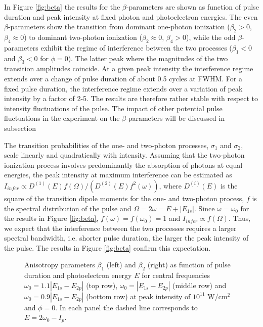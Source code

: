 In Figure \ref{fig:beta} the results for the \textbf{$\beta$}-parameters are shown as function of pulse duration and peak intensity at fixed photon and photoelectron energies. The even $\beta$-parameters show the transition from dominant one-photon ionization ($\beta_2 > 0$, $\beta_4 \approx 0$) to dominant two-photon ionization ($\beta_2 \approx 0$, $\beta_4 > 0$), while the odd $\beta$-parameters exhibit the regime of interference between the two processes ($\beta_1 < 0$ and $\beta_3 < 0$ for $\phi=0$). The latter peak where the magnitudes of the two transition amplitudes coincide. At a given peak intensity the interference regime extends over a change of pulse duration of about 0.5 cycles at FWHM. For a fixed pulse duration, the interference regime extends over a variation of peak intensity by a factor of 2-5. The results are therefore rather stable with respect to intensity fluctuations of the pulse. The impact of other potential pulse fluctuations in the experiment on the $\beta$-parameters will be discussed in subsection

The transition probabilities of the one- and two-photon processes, $\sigma_1$ and $\sigma_2$, scale linearly and quadratically with intensity. Assuming that the two-photon ionization process involves predominantly the absorption of photons at equal energies, the peak intensity at maximum interference can be estimated as $I_{infer} \propto D^{(1)}(E)f(\Omega)/(D^{(2)}(E)f^2(\omega))$, where $D^{(i)}(E)$ is the square of the transition dipole moments for the one- and two-photon process, $f$ is the spectral distribution of the pulse and $\Omega = 2\omega = E + |E_{1s}|$. Since $\omega = \omega_0$ for the results in Figure \ref{fig:beta}, $f(\omega) = f(\omega_0) = 1$ and $I_{infer} \propto f(\Omega)$. Thus, we expect that the interference between the two processes requires a larger spectral bandwidth, i.e. shorter pulse duration, the larger the peak intensity of the pulse. The results in Figure \ref{fig:beta} confirm this expectation.

\begin{figure}[t]
\centering
\caption{
Anisotropy parameters $\beta_1$ (left) and $\beta_2$ (right) as function of pulse duration and photoelectron energy $E$ for central frequencies $\omega_0 = 1.1 |E_{1s}-E_{2p}|$ (top row), $\omega_0 = |E_{1s}-E_{2p}|$ (middle row) and $\omega_0 = 0.9 |E_{1s}-E_{2p}|$ (bottom row) at peak intensity of $10^{11}$ W/cm$^2$ and $\phi = 0$. In each panel the dashed line corresponds to $E = 2\omega_0 - I_p$. 
} 
  \label{fig:beta_omega}
\end{figure}


